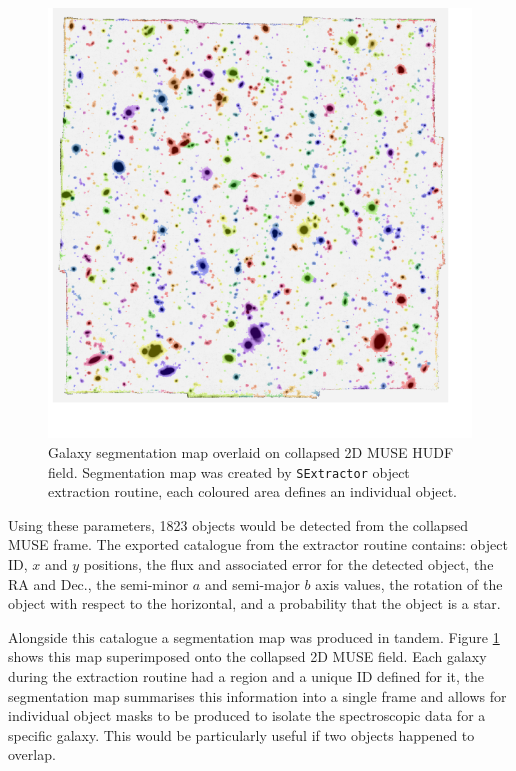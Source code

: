 \documentclass[12pt, twocolumn, nofootinbib]{revtex4-1}    %
\begin{document}
\begin{figure}
\includegraphics[width=\linewidth]{data/muse_seg_map.pdf}
\caption[MUSE Segmented]{Galaxy segmentation map overlaid on collapsed 2D MUSE HUDF field. Segmentation map was created by \texttt{SExtractor} object extraction routine, each coloured area defines an individual object.}
\label{fig:muse_seg_map}
\end{figure}

Using these parameters, 1823 objects would be detected from the collapsed MUSE frame. The exported catalogue from the extractor routine contains: object ID, $x$ and $y$ positions, the flux and associated error for the detected object, the RA and Dec., the semi-minor $a$ and semi-major $b$ axis values, the rotation of the object with respect to the horizontal, and a probability that the object is a star. 

Alongside this catalogue a segmentation map was produced in tandem. Figure \ref{fig:muse_seg_map} shows this map superimposed onto the collapsed 2D MUSE field. Each galaxy during the extraction routine had a region and a unique ID defined for it, the segmentation map summarises this information into a single frame and allows for individual object masks to be produced to isolate the spectroscopic data for a specific galaxy. This would be particularly useful if two objects happened to overlap. 
\end{document}
